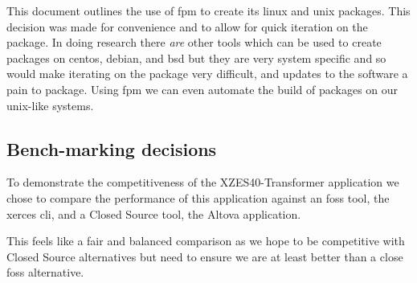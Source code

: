 This document outlines the use of \gls{fpm} to create its \gls{linux} and \gls{unix} packages.
This decision was made for convenience and to allow for quick iteration on the package.
In doing research there \textit{are} other tools which can be used to create packages on \gls{centos}, \gls{debian}, and \gls{bsd} but they are very system specific and so would make iterating on the package very difficult, and updates to the software a pain to package.
Using \gls{fpm} we can even automate the build of packages on our \gls{unix}-like systems.

\subsection{Bench-marking decisions}

To demonstrate the competitiveness of the XZES40-Transformer application we chose to compare the performance of this application against an \gls{foss} tool, the \gls{xerces} \gls{cli}, and a Closed Source tool, the Altova application.

This feels like a fair and balanced comparison as we hope to be competitive with Closed Source alternatives but need to ensure we are at least better than a close \gls{foss} alternative.
